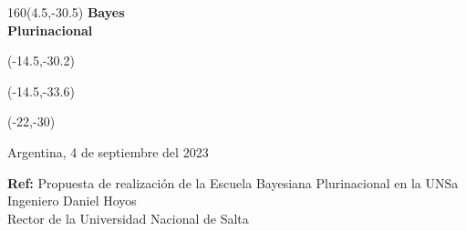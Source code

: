 \documentclass[a4paper,10pt]{letter}
\begin{document}
\begin{letter}

\begin{textblock}{160}(4.5,-30.5)
\noindent \Huge\textbf{Bayes \\ Plurinacional \\}
\end{textblock}
\begin{textblock}{80}(-14.5,-30.2)
\LARGE  {}
\end{textblock}
\begin{textblock}{80}(-14.5,-33.6)
\LARGE {\scalebox{5}{$p$}}
\end{textblock}
\begin{textblock}{80}(-22,-30)
\LARGE {\scalebox{2.505}{$($}}
\end{textblock}




\vspace{-4.2cm}

\begin{flushright}
Argentina, 4 de septiembre del 2023  \\
\end{flushright}

\noindent

\hfill \textbf{Ref:} Propuesta de realización de la Escuela Bayesiana Plurinacional en la UNSa \\


\noindent Ingeniero Daniel Hoyos \\
\noindent Rector de la Universidad Nacional de Salta\\ [0cm]


\end{letter}
\end{document}
